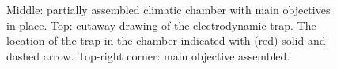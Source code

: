 \documentclass[preprint,review,12pt,dvips]{elsarticle}
\begin{document}
\begin{figure}[h!t!b!]
\begin{center}
\end{center}
\caption{Middle: partially assembled climatic chamber with main objectives in place. Top: cutaway drawing of the
electrodynamic trap. The location of the trap in the chamber indicated with (red) solid-and-dashed arrow. Top-right
corner: main objective assembled.} \label{setup}
\end{figure}
\end{document}
